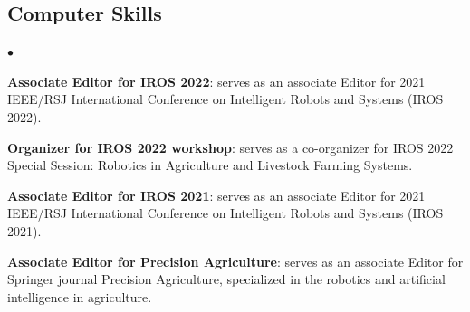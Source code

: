 \documentclass[margin,line]{res}
\newenvironment{list2}{
  \begin{list}{$\bullet$}{%
      \setlength{\itemsep}{0in}
      \setlength{\parsep}{0in} \setlength{\parskip}{0in}
      \setlength{\topsep}{0in} \setlength{\partopsep}{0in} 
      \setlength{\leftmargin}{0.2in}}}{\end{list}}
\begin{document}
\begin{resume}




\section{\sc Computer Skills} 
\begin{list2}

\item {\bf Associate Editor for IROS 2022}: serves as an associate Editor for 2021 IEEE/RSJ International Conference on Intelligent Robots and Systems (IROS 2022). \\

\item {\bf Organizer for IROS 2022 workshop}: serves as a co-organizer for IROS 2022 Special Session: Robotics in Agriculture and Livestock Farming Systems.\\

\item {\bf Associate Editor for IROS 2021}: serves as an associate Editor for 2021 IEEE/RSJ International Conference on Intelligent Robots and Systems (IROS 2021). \\

\item {\bf Associate Editor for Precision Agriculture}: serves as an associate Editor for Springer journal Precision Agriculture, specialized in the robotics and artificial intelligence in agriculture. \\


\end{list2}
\end{resume}
\end{document}
